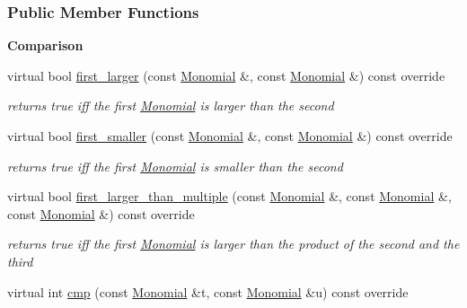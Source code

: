 \subsubsection*{Public Member Functions}
\begin{Indent}\textbf{ Comparison}\par
\begin{DoxyCompactItemize}
\item 
\mbox{\label{group__orderinggroup_ac412c73e940b4aabe1e350d6c98a99f5}} 
virtual bool \hyperlink{group__orderinggroup_ac412c73e940b4aabe1e350d6c98a99f5}{first\+\_\+larger} (const \hyperlink{group__polygroup_class_monomial}{Monomial} \&, const \hyperlink{group__polygroup_class_monomial}{Monomial} \&) const override
\begin{DoxyCompactList}\small\item\em returns {\ttfamily true} iff the first \hyperlink{group__polygroup_class_monomial}{Monomial} is larger than the second \end{DoxyCompactList}\item 
\mbox{\label{group__orderinggroup_a48ba39468e17d826988b28f5d871d868}} 
virtual bool \hyperlink{group__orderinggroup_a48ba39468e17d826988b28f5d871d868}{first\+\_\+smaller} (const \hyperlink{group__polygroup_class_monomial}{Monomial} \&, const \hyperlink{group__polygroup_class_monomial}{Monomial} \&) const override
\begin{DoxyCompactList}\small\item\em returns {\ttfamily true} iff the first \hyperlink{group__polygroup_class_monomial}{Monomial} is smaller than the second \end{DoxyCompactList}\item 
\mbox{\label{group__orderinggroup_a1696724ba30a8565b759bb2c8aeefde4}} 
virtual bool \hyperlink{group__orderinggroup_a1696724ba30a8565b759bb2c8aeefde4}{first\+\_\+larger\+\_\+than\+\_\+multiple} (const \hyperlink{group__polygroup_class_monomial}{Monomial} \&, const \hyperlink{group__polygroup_class_monomial}{Monomial} \&, const \hyperlink{group__polygroup_class_monomial}{Monomial} \&) const override
\begin{DoxyCompactList}\small\item\em returns {\ttfamily true} iff the first \hyperlink{group__polygroup_class_monomial}{Monomial} is larger than the product of the second and the third \end{DoxyCompactList}\item 
virtual int \hyperlink{group__orderinggroup_ae7103c92d45f749eaf3c5403b17a2828}{cmp} (const \hyperlink{group__polygroup_class_monomial}{Monomial} \&t, const \hyperlink{group__polygroup_class_monomial}{Monomial} \&u) const override
\end{DoxyCompactItemize}
\end{Indent}
